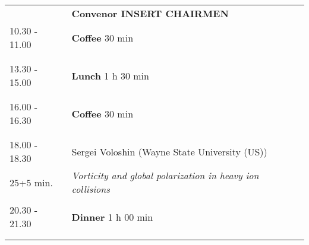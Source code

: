 \begin{longtable}{p{3cm}p{13cm}}
&\hfill {\bf Convenor INSERT CHAIRMEN }\\ 
10.30 - 11.00 & {\bf Coffee} \hfill 30 min \\ 
 & \\ 
 & \\ 
13.30 - 15.00 & {\bf Lunch} \hfill 1 h 30 min \\ 
 & \\ 
 & \\ 
16.00 - 16.30 & {\bf Coffee} \hfill 30 min \\ 
 & \\ 
 & \\ 
18.00 - 18.30 & Sergei Voloshin (Wayne State University (US))\\ 
25+5 min. & {\it Vorticity and global polarization in heavy ion collisions}\\ 
 & \\ 
20.30 - 21.30 & {\bf Dinner} \hfill 1 h 00 min \\ 
 & \\ 
 & \\ 
\end{longtable}

